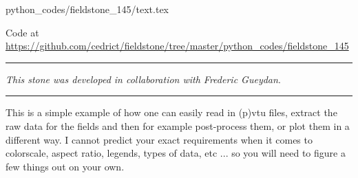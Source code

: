 \begin{flushright} {\tiny {\color{gray} python\_codes/fieldstone\_145/text.tex}} \end{flushright}



\begin{center}

Code at \url{https://github.com/cedrict/fieldstone/tree/master/python_codes/fieldstone_145}
\end{center}

\par\noindent\rule{\textwidth}{0.4pt}

{\sl This stone was developed in collaboration with Frederic Gueydan}. 

\par\noindent\rule{\textwidth}{0.4pt}

This \stone is a simple example of how one can easily read in (p)vtu files, extract the raw data for the fields and 
then for example post-process them, or plot them in a different way.
I cannot predict your exact requirements when it comes to colorscale, aspect ratio, legends, types of data, etc ...
so you will need to figure a few things out on your own. 

